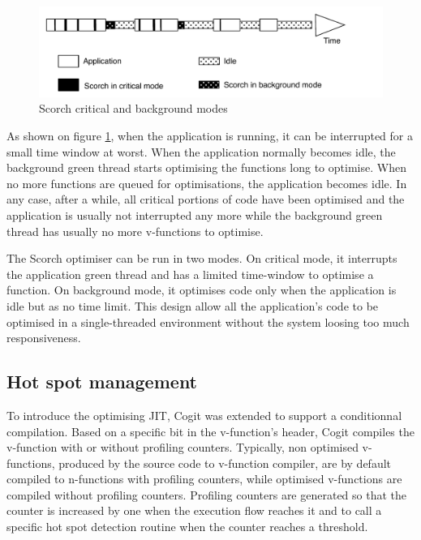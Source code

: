 \documentclass[a4paper,12pt,twoside]{../includes/ThesisStyle}
\begin{document}
\begin{figure}[h!]
    \begin{center}
        \includegraphics[width=0.95\linewidth]{ScorchModes}
        \caption{Scorch critical and background modes}
        \label{fig:ScorchModes}
    \end{center}
\end{figure}

As shown on figure \ref{fig:ScorchModes}, when the application is running, it can be interrupted for a small time window at worst. When the application normally becomes idle, the background green thread starts optimising the functions long to optimise. When no more functions are queued for optimisations, the application becomes idle. In any case, after a while, all critical portions of code have been optimised and the application is usually not interrupted any more while the background green thread has usually no more v-functions to optimise.

The Scorch optimiser can be run in two modes. On critical mode, it interrupts the application green thread and has a limited time-window to optimise a function. On background mode, it optimises code only when the application is idle but as no time limit. This design allow all the application's code to be optimised in a single-threaded environment without the system loosing too much responsiveness.

\subsection{Hot spot management}

To introduce the optimising JIT, Cogit was extended to support a conditionnal compilation. Based on a specific bit in the v-function's header, Cogit compiles the v-function with or without profiling counters. Typically, non optimised v-functions, produced by the source code to v-function compiler, are by default compiled to n-functions with profiling counters, while optimised v-functions are compiled without profiling counters. Profiling counters are generated so that the counter is increased by one when the execution flow reaches it and to call a specific hot spot detection routine when the counter reaches a threshold.
\end{document}
